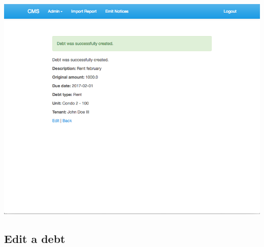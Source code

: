 \begin{itemize}
    \includegraphics[scale=0.25]{./images/ss/debt/create/5.png}
\end{itemize}

\subsection*{Edit a debt}

